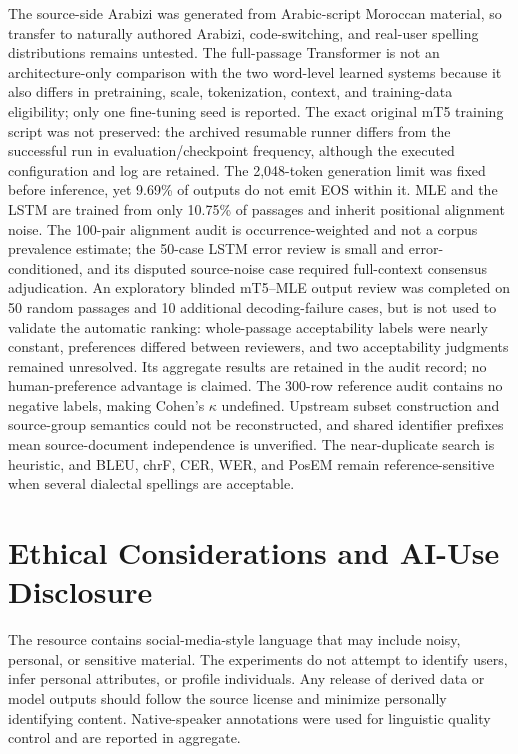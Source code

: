 \documentclass[runningheads]{llncs}
\begin{document}
The source-side Arabizi was generated from Arabic-script Moroccan material, so transfer to naturally authored Arabizi, code-switching, and real-user spelling distributions remains untested. The full-passage Transformer is not an architecture-only comparison with the two word-level learned systems because it also differs in pretraining, scale, tokenization, context, and training-data eligibility; only one fine-tuning seed is reported. The exact original mT5 training script was not preserved: the archived resumable runner differs from the successful run in evaluation/checkpoint frequency, although the executed configuration and log are retained. The 2,048-token generation limit was fixed before inference, yet 9.69\% of outputs do not emit EOS within it. MLE and the LSTM are trained from only 10.75\% of passages and inherit positional alignment noise. The 100-pair alignment audit is occurrence-weighted and not a corpus prevalence estimate; the 50-case LSTM error review is small and error-conditioned, and its disputed source-noise case required full-context consensus adjudication. An exploratory blinded mT5--MLE output review was completed on 50 random passages and 10 additional decoding-failure cases, but is not used to validate the automatic ranking: whole-passage acceptability labels were nearly constant, preferences differed between reviewers, and two acceptability judgments remained unresolved. Its aggregate results are retained in the audit record; no human-preference advantage is claimed. The 300-row reference audit contains no negative labels, making Cohen's $\kappa$ undefined. Upstream subset construction and source-group semantics could not be reconstructed, and shared identifier prefixes mean source-document independence is unverified. The near-duplicate search is heuristic, and BLEU, chrF, CER, WER, and PosEM remain reference-sensitive when several dialectal spellings are acceptable.

\section*{Ethical Considerations and AI-Use Disclosure}

The resource contains social-media-style language that may include noisy, personal, or sensitive material. The experiments do not attempt to identify users, infer personal attributes, or profile individuals. Any release of derived data or model outputs should follow the source license and minimize personally identifying content. Native-speaker annotations were used for linguistic quality control and are reported in aggregate.
\end{document}
